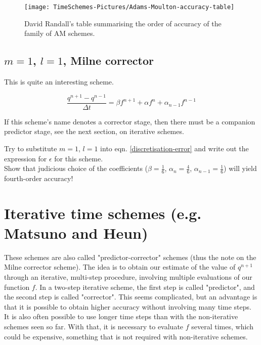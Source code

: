 \begin{figure}[h!]
	\texttt{[image: TimeSchemes-Pictures/Adams-Moulton-accuracy-table]}
	\caption{David Randall's table summarising the order of accuracy of the family of AM schemes.}
	\label{fig:Adams-Moulton-accuracy-table}
\end{figure}

\subsection{$m=1$, $l=1$, Milne corrector}

This is quite an interesting scheme. 

\begin{equation}
	\frac{q^{n+1}-q^{n-1}}{\Delta t} = \beta f^{n+1} + \alpha f^n + \alpha_{n-1} f^{n-1}
	\label{Milne-corrector}
\end{equation}

\begin{remark}
If this scheme's name denotes a corrector stage, then there must be a companion predictor stage, see the next section, on iterative schemes.
\end{remark}

\begin{exercise}
Try to substitute $m=1$, $l=1$ into eqn. \ref{discretisation-error} and write out the expression for $\epsilon$ for this scheme.\\
Show that judicious choice of the coefficients ($\beta = \frac{1}{6}$, $\alpha_n = \frac{4}{6}$, $\alpha_{n-1} = \frac{1}{6}$) will yield fourth-order accuracy!
\end{exercise}
	
\section{Iterative time schemes (e.g. Matsuno and Heun)}
These schemes are also called "predictor-corrector" schemes (thus the note on the Milne corrector scheme). The idea is to obtain our estimate of the value of $q^{n+1}$ through an iterative, multi-step procedure, involving multiple evaluations of our function $f$. In a two-step iterative scheme, the first step is called "predictor", and the second step is called "corrector". This seems complicated, but an advantage is that it is possible to obtain higher accuracy without involving many time steps. It is also often possible to use longer time steps than with the non-iterative schemes seen so far. With that, it is necessary to evaluate $f$ several times, which could be expensive, something that is not required with non-iterative schemes.

